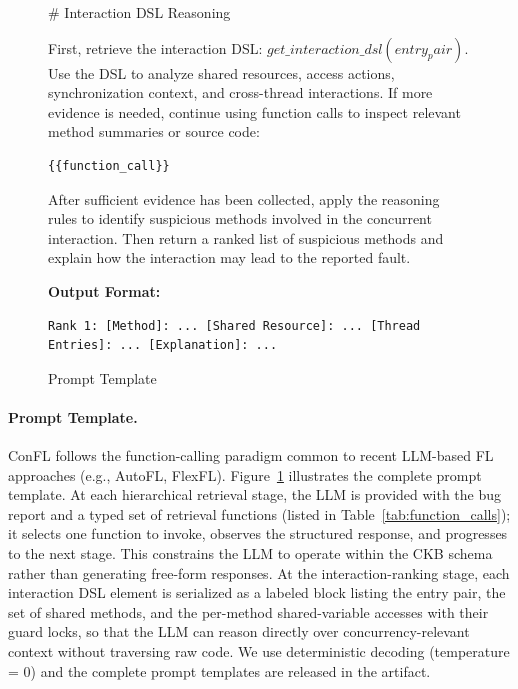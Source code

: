 \begin{figure}[H]
\begin{tcolorbox}[colback=gray!5,colframe=black!30]
\# Interaction DSL Reasoning

First, retrieve the interaction DSL: $get\_interaction\_dsl(entry_pair)$. Use the DSL to analyze shared resources, access actions, synchronization context, and cross-thread interactions. If more evidence is needed, continue using function calls to inspect relevant method summaries or source code:
\begin{verbatim}
{{function_call}}
\end{verbatim}

After sufficient evidence has been collected, apply the reasoning rules to identify suspicious methods involved in the concurrent interaction. Then return a ranked list of suspicious methods and explain how the interaction may lead to the reported fault.

\textbf{Output Format:}

\begin{verbatim}
Rank 1: [Method]: ... [Shared Resource]: ... [Thread Entries]: ... [Explanation]: ...
\end{verbatim}
\end{tcolorbox}
\vspace{-0.4em}
\caption{Prompt Template} \label{template}
\vspace{-0.15in}
\end{figure}


\paragraph{Prompt Template.} 
ConFL follows the function-calling paradigm common to recent LLM-based FL approaches (e.g., AutoFL, FlexFL). Figure~\ref{template} illustrates the complete prompt template. At each hierarchical retrieval stage, the LLM is provided with the bug report and a typed set of retrieval functions (listed in Table~\ref{tab:function_calls}); it selects one function to invoke, observes the structured response, and progresses to the next stage. This constrains the LLM to operate within the CKB schema rather than generating free-form responses. At the interaction-ranking stage, each interaction DSL element is serialized as a labeled block listing the entry pair, the set of shared methods, and the per-method shared-variable accesses with their guard locks, so that the LLM can reason directly over concurrency-relevant context without traversing raw code. We use deterministic decoding (temperature = 0) and the complete prompt templates are released in the artifact.



 